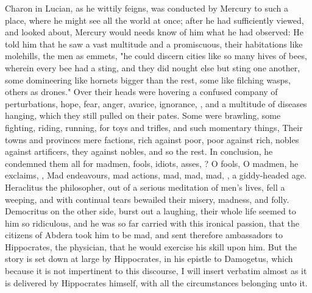 Charon in Lucian, as he wittily feigns, was conducted by
Mercury to such a place, where he might see all the world at once; after he had
sufficiently viewed, and looked about, Mercury would needs know of him what he
had observed: He told him that he saw a vast multitude and a promiscuous, their
habitations like molehills, the men as emmets, "he could discern cities like so
many hives of bees, wherein every bee had a sting, and they did nought else but
sting one another, some domineering like hornets bigger than the rest, some
like filching wasps, others as drones." Over their heads were hovering a
confused company of perturbations, hope, fear, anger, avarice, ignorance,
\etc{}, and a multitude of diseases hanging, which they still pulled on their
pates. Some were brawling, some fighting, riding, running,  for toys and trifles, and such momentary things,
Their towns and provinces mere factions, rich against poor, poor against rich,
nobles against artificers, they against nobles, and so the rest. In conclusion,
he condemned them all for madmen, fools, idiots, asses, ? O fools, O madmen, he exclaims, , \etc{} Mad endeavours, mad actions, mad, mad, mad,
, a giddy-headed age.
Heraclitus the philosopher, out of a serious meditation of men's lives, fell a
weeping, and with continual tears bewailed their misery, madness, and folly.
Democritus on the other side, burst out a laughing, their whole life seemed to
him so ridiculous, and he was so far carried with this ironical passion, that
the citizens of Abdera took him to be mad, and sent therefore ambassadors to
Hippocrates, the physician, that he would exercise his skill upon him. But the
story is set down at large by Hippocrates, in his epistle to Damogetus, which
because it is not impertinent to this discourse, I will insert verbatim almost
as it is delivered by Hippocrates himself, with all the circumstances belonging
unto it.

